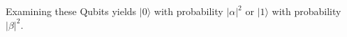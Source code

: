 \documentclass[preview]{standalone}
\begin{document}
\begin{center}
Examining these Qubits yields $ | 0 \rangle $ with probability $ | \alpha |^2 $ or $ |1 \rangle$  with probability $ | \beta |^2 $.
\end{center}
\end{document}
